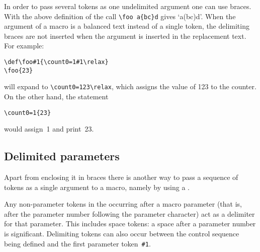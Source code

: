 In order to pass several tokens as one undelimited argument
one can use braces. With the above definition of 
the call \verb>\foo a{bc}d> gives `\hbox{a(bc)d}'.
When the argument of a macro is a balanced text instead of
a single token, the delimiting braces are not inserted when 
the argument is
inserted in the replacement text.
For example:
\begin{verbatim}
\def\foo#1{\count0=1#1\relax}
\foo{23}
\end{verbatim}
will expand to \verb>\count0=123\relax>,
which assigns the value of 123 to the counter.
On the other hand,  the statement
\begin{verbatim}
\count0=1{23}
\end{verbatim}
would
assign~1 and print~23.

\subsection{Delimited parameters}

Apart from enclosing it in braces there is another way
to pass a sequence of tokens as a single argument to a macro,
namely by using a .

Any non-parameter tokens in the  occurring
after a macro parameter (that is, after the parameter number
following the parameter character)
act as a delimiter for that parameter. This includes space tokens:
a space after a parameter number is significant.
Delimiting tokens can also occur between the control
sequence being defined and the first parameter token~\verb>#1>.

